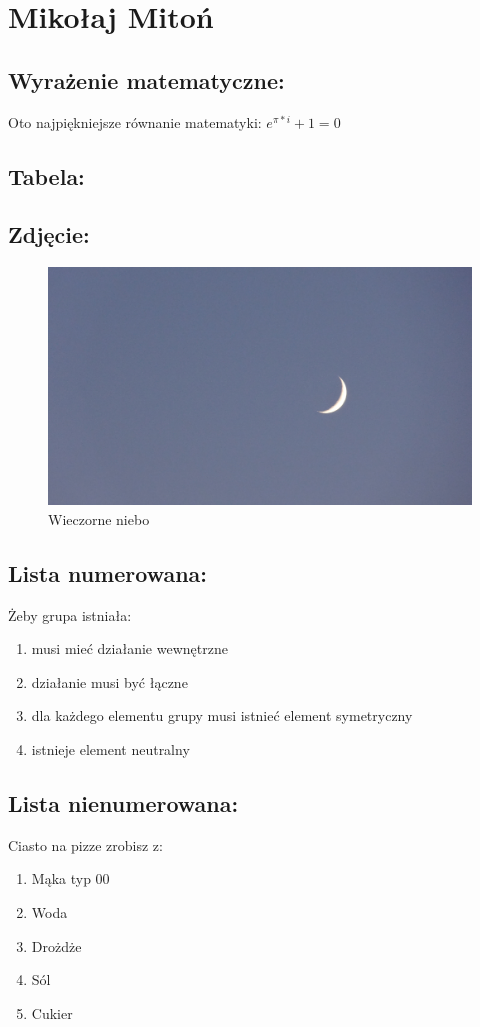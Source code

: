 \section{Mikołaj Mitoń}

\subsection{Wyrażenie matematyczne: }
Oto najpiękniejsze równanie matematyki:
\(e^{\pi * i} + 1 = 0\)

\subsection{Tabela: }
\begin{figure}[htbp]
    \centering
    
    \label{fig:tabelka}
\end{figure}

\subsection{Zdjęcie: }
\begin{figure}[H] 
    \centering
    \includegraphics[width=0.5\linewidth]{pictures/DSC00685.JPG}
    \caption{Wieczorne niebo}
    \label{fig:niebo}
\end{figure}

\subsection{Lista numerowana: }
Żeby grupa istniała:
\begin{enumerate}
    \item musi mieć działanie wewnętrzne
    \item działanie musi być łączne
    \item dla każdego elementu grupy musi istnieć element symetryczny
    \item istnieje element neutralny
\end{enumerate}

\subsection{Lista nienumerowana: }
Ciasto na pizze zrobisz z:
\begin{enumerate}
    \item Mąka typ 00
    \item Woda
    \item Drożdże
    \item Sól
    \item Cukier
\end{enumerate}

